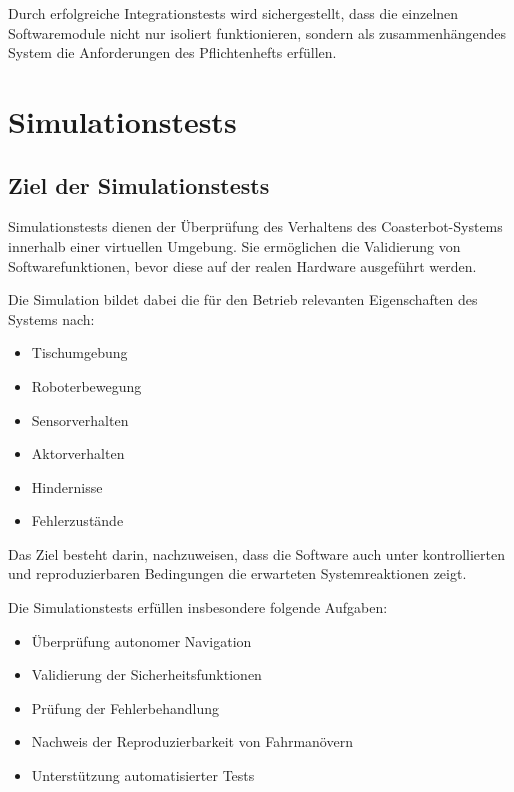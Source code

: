 \documentclass[
  a4paper,
  12pt,
  DIV=12,        %
  parskip=half,  %
  headings=small %
]{scrartcl}
\theoremstyle{definition}
\providecommand{\tightlist}{%
  \setlength{\itemsep}{0pt}\setlength{\parskip}{0pt}}
\theoremstyle{definition}
\begin{document}
Durch erfolgreiche Integrationstests wird sichergestellt, dass die
einzelnen Softwaremodule nicht nur isoliert funktionieren, sondern als
zusammenhängendes System die Anforderungen des Pflichtenhefts erfüllen.

\section{Simulationstests}\label{simulationstests-1}

\subsection{Ziel der Simulationstests}\label{ziel-der-simulationstests}

Simulationstests dienen der Überprüfung des Verhaltens des
Coasterbot-Systems innerhalb einer virtuellen Umgebung. Sie ermöglichen
die Validierung von Softwarefunktionen, bevor diese auf der realen
Hardware ausgeführt werden.

Die Simulation bildet dabei die für den Betrieb relevanten Eigenschaften
des Systems nach:

\begin{itemize}
\tightlist
\item
  Tischumgebung
\item
  Roboterbewegung
\item
  Sensorverhalten
\item
  Aktorverhalten
\item
  Hindernisse
\item
  Fehlerzustände
\end{itemize}

Das Ziel besteht darin, nachzuweisen, dass die Software auch unter
kontrollierten und reproduzierbaren Bedingungen die erwarteten
Systemreaktionen zeigt.

Die Simulationstests erfüllen insbesondere folgende Aufgaben:

\begin{itemize}
\tightlist
\item
  Überprüfung autonomer Navigation
\item
  Validierung der Sicherheitsfunktionen
\item
  Prüfung der Fehlerbehandlung
\item
  Nachweis der Reproduzierbarkeit von Fahrmanövern
\item
  Unterstützung automatisierter Tests
\end{itemize}
\end{document}
